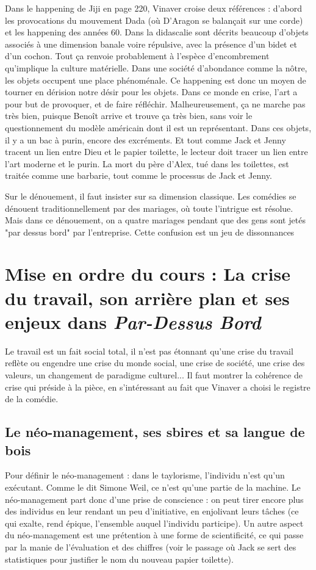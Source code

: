 \documentclass[a4paper,12pt]{book}
\begin{document}
\par Dans le happening de Jiji en page 220, Vinaver croise deux références : d'abord les provocations du mouvement Dada (où D'Aragon se balançait sur une corde) et les happening des années 60. Dans la didascalie sont décrits beaucoup d'objets associés à une dimension banale voire répulsive, avec la présence d'un bidet et d'un cochon. Tout ça renvoie probablement à l'espèce d'encombrement qu'implique la culture matérielle. Dans une société d'abondance comme la nôtre, les objets occupent une place phénoménale. Ce happening est donc un moyen de tourner en dérision notre désir pour les objets. Dans ce monde en crise, l'art a pour but de provoquer, et de faire réfléchir. Malheureusement, ça ne marche pas très bien, puisque Benoît arrive et trouve ça très bien, sans voir le questionnement du modèle américain dont il est un représentant. Dans ces objets, il y a un bac à purin, encore des excréments. Et tout comme Jack et Jenny tracent un lien entre Dieu et le papier toilette, le lecteur doit tracer un lien entre l'art moderne et le purin. La mort du père d'Alex, tué dans les toilettes, est traitée comme une barbarie, tout comme le processus de Jack et Jenny.
\par Sur le dénouement, il faut insister sur sa dimension classique. Les comédies se dénouent traditionnellement par des mariages, où toute l'intrigue est résolue. Mais dans ce dénouement, on a quatre mariages pendant que des gens sont jetés "par dessus bord" par l'entreprise. Cette confusion est un jeu de dissonnances 
\section{Mise en ordre du cours : La crise du travail, son arrière plan et ses enjeux dans \textit{Par-Dessus Bord}}
Le travail est un fait social total, il n'est pas étonnant qu'une crise du travail reflète ou engendre une crise du monde social, une crise de société, une crise des valeurs, un changement de paradigme culturel... Il faut montrer la cohérence de crise qui préside à la pièce, en s'intéressant au fait que Vinaver a choisi le registre de la comédie.

\subsection{Le néo-management, ses sbires et sa langue de bois}
Pour définir le néo-management : dans le taylorisme, l'individu n'est qu'un exécutant. Comme le dit Simone Weil, ce n'est qu'une partie de la machine. Le néo-management part donc d'une prise de conscience : on peut tirer encore plus des individus en leur rendant un peu d'initiative, en enjolivant leurs tâches (ce qui exalte, rend épique, l'ensemble auquel l'individu participe). Un autre aspect du néo-management est une prétention à une forme de scientificité, ce qui passe par la manie de l'évaluation et des chiffres (voir le passage où Jack se sert des statistiques pour justifier le nom du nouveau papier toilette).
\end{document}
